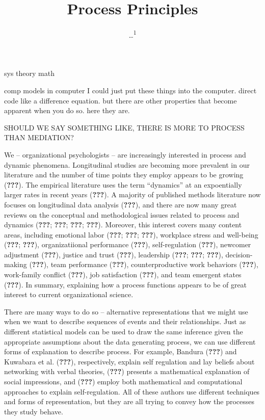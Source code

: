 \documentclass[english,,man]{apa6}
\title{Process Principles}
\author{\ldots{}\textsuperscript{1}}
\date{}
\affiliation{
\vspace{0.5cm}
\textsuperscript{1} ...}
\theoremstyle{definition}
\theoremstyle{definition}
\theoremstyle{definition}
\theoremstyle{remark}
\begin{document}
\maketitle

sys theory math

comp models in computer I could just put these things into the computer.
direct code like a difference equation. but there are other properties
that become apparent when you do so. here they are.

SHOULD WE SAY SOMETHING LIKE, THERE IS MORE TO PROCESS THAN MEDIATION?

We -- organizational psychologists -- are increasingly interested in
process and dynamic phenomena. Longitudinal studies are becoming more
prevalent in our literature and the number of time points they employ
appears to be growing ({\textbf{???}}). The empirical literature uses
the term \enquote{dynamics} at an expoentially larger rates in recent
years ({\textbf{???}}). A majority of published methods literature now
focuses on longitudinal data analysis ({\textbf{???}}), and there are
now many great reviews on the conceptual and methodological issues
related to process and dynamics ({\textbf{???}}; {\textbf{???}};
{\textbf{???}}; {\textbf{???}}). Moreover, this interest covers many
content areas, including emotional labor ({\textbf{???}};
{\textbf{???}}; {\textbf{???}}), workplace stress and well-being
({\textbf{???}}; {\textbf{???}}), organizatiional performance
({\textbf{???}}), self-regulation ({\textbf{???}}), newcomer adjustment
({\textbf{???}}), justice and trust ({\textbf{???}}), leadership
({\textbf{???}}; {\textbf{???}}; {\textbf{???}}), decision-making
({\textbf{???}}), team performance ({\textbf{???}}), counterproductive
work behaviors ({\textbf{???}}), work-family conflict ({\textbf{???}}),
job satisfaction ({\textbf{???}}), and team emergent states
({\textbf{???}}). In summary, explaining how a process functions appears
to be of great interest to current organizational science.

There are many ways to do so -- alternative representations that we
might use when we want to describe sequences of events and their
relationships. Just as different statistical models can be used to draw
the same inference given the appropriate assumptions about the data
generating process, we can use different forms of explanation to
describe process. For example, Bandura ({\textbf{???}}) and Kuwabara et
al. ({\textbf{???}}), respectively, explain self regulation and lay
beliefs about networking with verbal theories, ({\textbf{???}}) presents
a mathematical explanation of social impressions, and ({\textbf{???}})
employ both mathematical and computational approaches to explain
self-regulation. All of these authors use different techniques and forms
of representation, but they are all trying to convey how the processes
they study behave.
\end{document}
